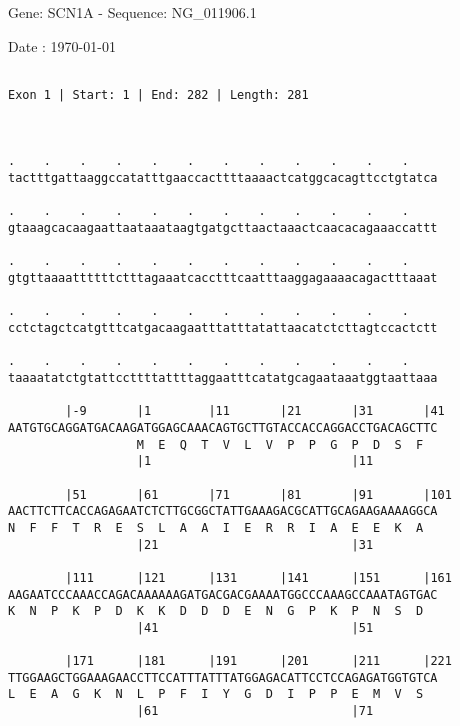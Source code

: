 \documentclass{article}
\begin{document}
\begin{center}
\begin{large}
 Gene: SCN1A - Sequence: NG\_011906.1
 
 Date : \today
\end{large}
\end{center}
 \begin{Verbatim}
 
Exon 1 | Start: 1 | End: 282 | Length: 281



.    .    .    .    .    .    .    .    .    .    .    .    
tactttgattaaggccatatttgaaccacttttaaaactcatggcacagttcctgtatca
                                                            
.    .    .    .    .    .    .    .    .    .    .    .    
gtaaagcacaagaattaataaataagtgatgcttaactaaactcaacacagaaaccattt
                                                            
.    .    .    .    .    .    .    .    .    .    .    .    
gtgttaaaattttttctttagaaatcacctttcaatttaaggagaaaacagactttaaat
                                                            
.    .    .    .    .    .    .    .    .    .    .    .    
cctctagctcatgtttcatgacaagaatttatttatattaacatctcttagtccactctt
                                                            
.    .    .    .    .    .    .    .    .    .    .    .    
taaaatatctgtattccttttattttaggaatttcatatgcagaataaatggtaattaaa
                                                            
        |-9       |1        |11       |21       |31       |41
AATGTGCAGGATGACAAGATGGAGCAAACAGTGCTTGTACCACCAGGACCTGACAGCTTC
                  M  E  Q  T  V  L  V  P  P  G  P  D  S  F  
                  |1                            |11         
  
        |51       |61       |71       |81       |91       |101
AACTTCTTCACCAGAGAATCTCTTGCGGCTATTGAAAGACGCATTGCAGAAGAAAAGGCA
N  F  F  T  R  E  S  L  A  A  I  E  R  R  I  A  E  E  K  A  
                  |21                           |31         
  
        |111      |121      |131      |141      |151      |161
AAGAATCCCAAACCAGACAAAAAAGATGACGACGAAAATGGCCCAAAGCCAAATAGTGAC
K  N  P  K  P  D  K  K  D  D  D  E  N  G  P  K  P  N  S  D  
                  |41                           |51         
  
        |171      |181      |191      |201      |211      |221
TTGGAAGCTGGAAAGAACCTTCCATTTATTTATGGAGACATTCCTCCAGAGATGGTGTCA
L  E  A  G  K  N  L  P  F  I  Y  G  D  I  P  P  E  M  V  S  
                  |61                           |71         
  

\end{Verbatim}
\end{document}
